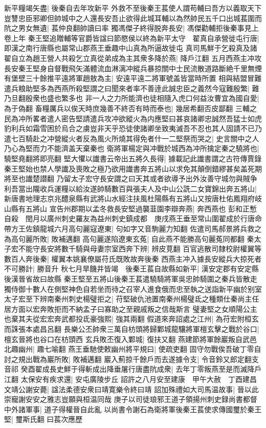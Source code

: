 新平糧竭矢盡|{
	後秦自去年攻新平}
外救不至後秦王萇使人謂苟輔曰吾方以義取天下豈讐忠臣邪卿但帥城中之人還長安吾止欲得此城耳輔以為然帥民五千口出城萇圍而阬之男女無遺|{
	萇仲良翻帥讀曰率}
獨馮傑子終得脱奔長安|{
	馮傑勸輔拒後秦事見上卷上年}
秦王堅追贈輔等官爵皆諡曰節愍侯以終為新平太守　翟真自承營徙屯行唐|{
	即漢之南行唐縣也屬常山郡燕王垂趣中山真為所逼故徙屯}
真司馬鮮于乞殺真及諸翟自立為趙王營人共殺乞立真從弟成為主其衆多降於燕|{
	降戶江翻}
五月西燕主冲攻長安秦王堅身自督戰飛矢滿體流血淋漓冲縱兵暴掠關中士民流散道路斷絶千里無煙有堡壁三十餘推平遠將軍趙敖為主|{
	安遠平遠二將軍號盖皆當時所置}
相與結盟冒難遣兵粮助堅多為西燕所殺堅謂之曰聞來者率不善逹此誠忠臣之義然今寇難殷繁|{
	難乃旦翻殷衆也盛也繁多也}
非一人之力所能濟也徒相隨入虎口何益汝曹宜為國自愛|{
	為于偽翻}
畜糧厲兵以俟天時庶幾善不終否有時而泰也|{
	幾居希翻否皮鄙翻}
三輔之民為冲所畧者遣人密告堅請遣兵攻冲欲縱火為内應堅曰甚哀諸卿忠誠然吾猛士如虎豹利兵如霜雪困於烏合之虜豈非天乎恐徒使諸卿坐致夷滅吾不忍也其人固請不已乃遣七百騎赴之冲營縱火者反為風火所燒其得免者什一二堅祭而哭之|{
	史言關中之人乃心為堅而力不能濟盖天棄秦也}
衛將軍楊定與冲戰於城西為冲所擒定秦之驍將也|{
	驍堅堯翻將即亮翻}
堅大懼以䜟書云帝出五將久長得|{
	據載記此䜟書謂之古符傳賈錄秦王堅始也禁人學䜟及喪敗之極乃欲用䜟書奔五將山以求免其顛倒錯繆甚矣盖死期將至也䜟楚譛翻}
乃留太子宏守長安謂之曰天其或者欲導予出外汝善守城勿與賊争利吾當出隴收兵運糧以給汝遂帥騎數百與張夫人及中山公詵二女寶錦出奔五將山|{
	新唐書地理志京兆醴泉縣有武將山水經注扶風杜陽縣有五將山又按唐杜佑鳳翔府岐山縣有五將山}
宣告州郡期以孟冬救長安堅過襲韮園李辯奔燕|{
	奔西燕也}
彭和正慙自殺　閏月以廣州刺史羅友為益州刺史鎮成都　庚戌燕王垂至常山圍翟成於行唐命帶方王佐鎮龍城六月高句麗寇遼東|{
	句如字又音駒麗力知翻}
佐遣司馬郝景將兵救之為高句麗所敗|{
	敗補邁翻}
高句麗遂陷遼東玄菟|{
	自此燕不能勝高句麗菟同都翻}
秦太子宏不能守長安將數千騎與母妻宗室西奔下辨|{
	辨皮莧翻}
百官逃散司隸校尉權翼等數百人奔後秦|{
	權翼本姚襄僚屬苻氏既敗故奔後秦}
西燕主冲入據長安縱兵大掠死者不可勝計|{
	勝音升}
秋七月旱饑井皆竭　後秦王萇自故縣如新平|{
	漢安定郡有安定縣後漢晉省故曰故縣}
秦王堅至五將山後秦王萇遣驍騎將軍吳忠帥騎圍之秦兵皆散走獨侍御十數人在側堅神色自若坐而待之召宰人進食俄而忠至執之送詣新平幽於别室太子宏至下辨南秦州刺史楊璧拒之|{
	苻堅破仇池置南秦州楊璧氐之種類仕秦尚主任居方面以宏奔敗拒而不納孟子曰寡助之至親戚叛之信哉斯言}
璧妻堅之女順陽公主也棄其夫從宏宏奔武都投氐豪強熙|{
	強其兩翻}
假道來奔詔處之江州|{
	為苻宏附桓玄而誅張本處昌呂翻}
長樂公丕帥衆三萬自枋頭將歸鄴城龍驤將軍檀玄擊之戰於谷口|{
	檀玄晉將也谷口在枋頭西}
玄兵敗丕復入鄴城|{
	復扶又翻}
燕建節將軍餘巖叛自武邑北趣幽州|{
	趣七喻翻}
燕王垂馳使敕幽州將平規曰|{
	使疏吏翻}
固守勿戰俟吾破丁零自討之規出戰為巖所敗|{
	敗補邁翻}
巖入薊掠千餘戶而去遂據令支|{
	令音鈴又郎定翻支音祁}
癸酉翟成長史鮮于得斬成出降垂屠行唐盡阬成衆|{
	去年丁零叛燕至是而滅降戶江翻}
太保安有疾求還|{
	安屯廣陵步丘}
詔許之八月安至建康　甲午大赦　丁酉建昌文靖公謝安薨|{
	諡法柔德安衆曰靖寛樂令終曰靖}
詔加殊禮如大司馬温故事|{
	晉以此崇寵謝安安之雅志豈願與桓温同哉}
庚子以司徒琅邪王道子領揚州刺史録尚書都督中外諸軍事|{
	道子得權晉自此亂}
以尚書令謝石為衛將軍後秦王萇使求傳國璽於秦王堅|{
	璽斯氏翻}
曰萇次應歷

